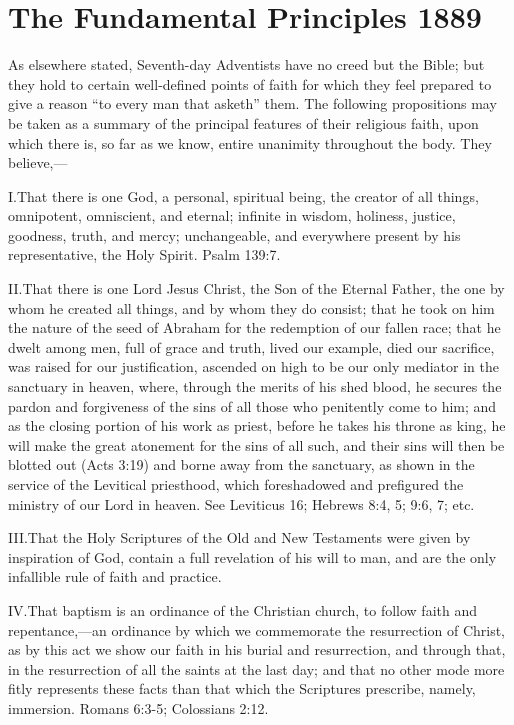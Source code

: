  \label{chap:appendix}


\section*{The Fundamental Principles 1889}

As elsewhere stated, Seventh-day Adventists have no creed but the Bible; but they hold to certain well-defined points of faith for which they feel prepared to give a reason “to every man that asketh” them. The following propositions may be taken as a summary of the principal features of their religious faith, upon which there is, so far as we know, entire unanimity throughout the body. They believe,— 

\lettrine{I.} That there is one God, a personal, spiritual being, the creator of all things, omnipotent, omniscient, and eternal; infinite in wisdom, holiness, justice, goodness, truth, and mercy; unchangeable, and everywhere present by his representative, the Holy Spirit. Psalm 139:7.

\lettrine{II.} That there is one Lord Jesus Christ, the Son of the Eternal Father, the one by whom he created all things, and by whom they do consist; that he took on him the nature of the seed of Abraham for the redemption of our fallen race; that he dwelt among men, full of grace and truth, lived our example, died our sacrifice, was raised for our justification, ascended on high to be our only mediator in the sanctuary in heaven, where, through the merits of his shed blood, he secures the pardon and forgiveness of the sins of all those who penitently come to him; and as the closing portion of his work as priest, before he takes his throne as king, he will make the great atonement for the sins of all such, and their sins will then be blotted out (Acts 3:19) and borne away from the sanctuary, as shown in the service of the Levitical priesthood, which foreshadowed and prefigured the ministry of our Lord in heaven. See Leviticus 16; Hebrews 8:4, 5; 9:6, 7; etc.

\lettrine{III.} That the Holy Scriptures of the Old and New Testaments were given by inspiration of God, contain a full revelation of his will to man, and are the only infallible rule of faith and practice.

\lettrine{IV.} That baptism is an ordinance of the Christian church, to follow faith and repentance,—an ordinance by which we commemorate the resurrection of Christ, as by this act we show our faith in his burial and resurrection, and through that, in the resurrection of all the saints at the last day; and that no other mode more fitly represents these facts than that which the Scriptures prescribe, namely, immersion. Romans 6:3-5; Colossians 2:12.

